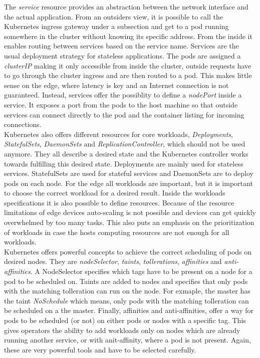 The \textit{service} resource provides an abstraction between the network interface and the actual application. From an outsiders view, it is possible to call the Kubernetes ingress gateway under a subsection and get to a pod running somewhere in the cluster without knowing its specific address. From the inside it enables routing between services based on the service name. Services are the usual deployment strategy for stateless applications. The pods are assigned a \textit{clusterIP} making it only accessible from inside the cluster, outside requests have to go through the cluster ingress and are then routed to a pod. This makes little sense on the edge, where latency is key and an Internet connection is not guaranteed. Instead, services offer the possiblity to define a \textit{nodePort} inside a service. It exposes a port from the pods to the host machine so that outside services can connect directly to the pod and the container listing for incoming connections.\\
Kubernetes also offers different resources for core workloads, \textit{Deployments},  \textit{StatefulSets},  \textit{DaemonSets} and  \textit{ReplicationController}, which should not be used anymore\cite{CoreWorkloadKubernetes66:online}. They all describe a desired state and the Kubernetes controller works towards fulfilling this desired state. Deployments are mainly used for stateless services. StatefulSets are used for stateful services and DaemonSets are to deploy pods on each node. For the edge all workloads are important, but it is important to choose the correct workload for a desired result. Inside the workloads specifications it is also possible to define resources. Because of the resource limitations of edge devices auto-scaling is not possible and devices can get quickly overwhelmed by too many tasks. This also puts an emphasis on the prioritization of workloads in case the hosts computing resources are not enough for all workloads.\\
Kubernetes offers powerful concepts to achieve the correct scheduling of pods on desired nodes. They are \textit{nodeSelector}, \textit{taints}, \textit{tollerations}, \textit{affinities} and \textit{anti-affinities}. A NodeSelector specifies which tags have to be present on a node for a pod to be scheduled on. Taints are added to nodes and specifies that only pods with the matching tolleration can run on the node. For exmaple, the master has the taint \textit{NoSchedule} which means, only pods with the matching tolleration can be scheduled on a the master. Finally, affinities and anti-affinities, offer a way for pods to be scheduled (or not) on either pods or nodes with a specific tag. This gives operators the ability to add workloads only on nodes which are already running another service, or with anit-affinity, where a pod is not present. Again, these are very powerful tools and have to be selected carefully.\\

